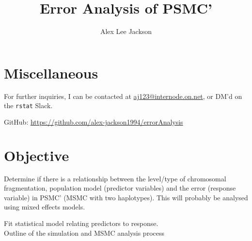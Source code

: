 \documentclass[11pt,a4paper]{article}
\title{Error Analysis of PSMC'}
\author{Alex Lee Jackson}
\begin{document}
\maketitle

%
\section{Miscellaneous}
For further inquiries, I can be contacted at \href{mailto:aj123@internode.on.net}{aj123@internode.on.net}, or DM'd on the \texttt{rstat} Slack.

GitHub: \url{https://github.com/alex-jackson1994/errorAnalysis}

\section{Objective}
Determine if there is a relationship between the level/type of chromosomal fragmentation, population model (predictor variables) and the error (response variable) in PSMC' (MSMC\cite{schiffels2014inferring} with two haplotypes). This will probably be analysed using mixed effects models.\\

\begin{algorithm}[H]
  Fit statistical model relating predictors to response.\\
  \caption{Outline of the simulation and MSMC analysis process}\label{overall}
\end{algorithm}
\end{document}
